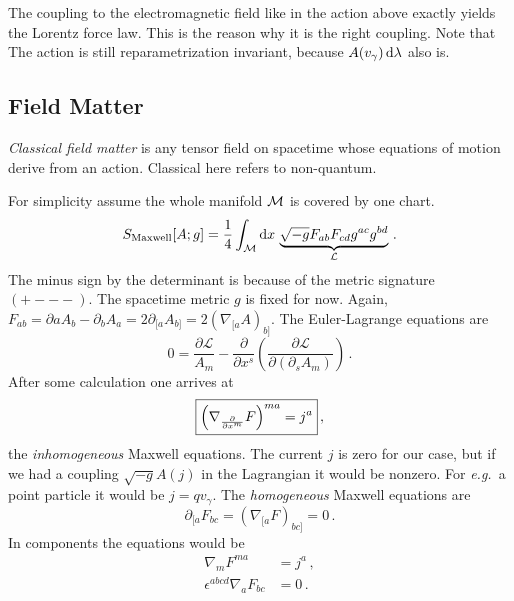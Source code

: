 \begin{example}
    The coupling to the electromagnetic field like in the action above exactly yields the
    Lorentz force law.
    This is the reason why it is the right coupling.
    Note that The action is still reparametrization invariant, because
    $A(v_\gamma)\operatorname{d\!}\lambda$ also is.
\end{example}

\subsection{Field Matter}
\begin{defn}
    \textit{Classical field matter} is any tensor field on spacetime whose equations
    of motion derive from an action.
    Classical here refers to non-quantum.
\end{defn}
\begin{example}
    For simplicity assume the whole manifold $\mathcal{M}$ is covered by one chart.
    \begin{equation}
        S_\text{Maxwell}[A;g] = \frac{1}{4} \int_{\mathcal{M}} \operatorname{d\!} x\,\underbrace{\sqrt{-g} F_{ab}F_{cd}g^{ac}g^{bd}}_\mathcal{L}\,.
    \end{equation}
    The minus sign by the determinant is because of the metric signature $(+---)$.
    The spacetime metric $g$ is fixed for now.
    Again, $F_{ab} = \partial a A_b - \partial_b A_a = 2 \partial_{[a}A_{b]} = 2 (\nabla_{[a}A)_{b]}$.
    The Euler-Lagrange equations are
    \begin{equation}
        0 = \frac{\partial \mathcal{L}}{A_m} 
        - \frac{\partial}{\partial x^s}\left( \frac{\partial \mathcal{L}}{\partial(\partial_s A_m)} \right)\,.
    \end{equation}
    After some calculation one arrives at
    \begin{equation}
        \boxed{%
        \left( \nabla_{\frac{\partial}{\partial x^m}} F \right)^{ma} = j^a
    }\,,
    \end{equation}
    the \textit{inhomogeneous} Maxwell equations.
    The current $j$ is zero for our case, but if we had a coupling $\sqrt{-g} A(j)$ in the Lagrangian
    it would be nonzero. For \textit{e.g.}\ a point particle it would be $j = q v_\gamma$.
    The \textit{homogeneous} Maxwell equations are
    \begin{equation}
        \partial_{[a}F_{bc} = \left( \nabla_{[a}F \right)_{bc]} = 0\,.
    \end{equation}
    In components the equations would be
    \begin{align*}
        \nabla_m F^{ma} &= j^a\,,\\
        \epsilon^{abcd}\nabla_a F_{bc} &= 0\,.
    \end{align*}
\end{example}

